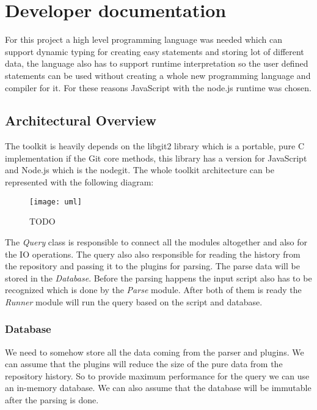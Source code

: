 \chapter{Developer documentation}
\label{ch:impl}

For this project a high level programming language was needed which can support dynamic typing for creating easy statements and storing
lot of different data, the language also has to support runtime interpretation so the user defined statements can be used without
creating a whole new programming language and compiler for it. For these reasons JavaScript with the node.js runtime was chosen. 

\section{Architectural Overview}

The toolkit is heavily depends on the libgit2 \cite{libgit2} library which is a portable, pure C implementation  if the Git core methods,
this library has a version for JavaScript and Node.js which is the nodegit\cite{nodegit}.
The whole toolkit architecture can be represented with the following diagram:

\begin{figure}[H]
	\centering
	\texttt{[image: uml]}
	\caption{TODO}
	\label{fig:fig-help}
\end{figure}

The \textit{Query} class is responsible to connect all the modules altogether and also for the IO operations. The query also also
responsible for reading the history from the repository and passing it to the plugins for parsing. The parse data will be stored
in the \textit{Database}. Before the parsing happens the input script also has to be recognized which is done by the \textit{Parse}
module. After both of them is ready the \textit{Runner} module will run the query based on the script and database.

\subsection{Database}

We need to somehow store all the data coming from the parser and plugins. We can assume that the plugins will reduce the size of the
pure data from the repository history. So to provide maximum performance for the query we can use an in-memory database. 
We can also assume that the database will be immutable after the parsing is done. 

